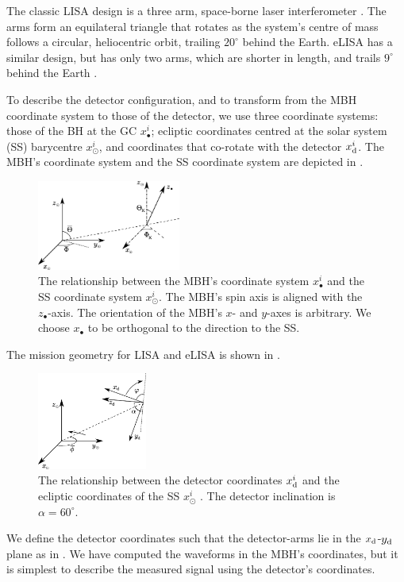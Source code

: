 The classic LISA design is a three arm, space-borne laser interferometer \citep{Bender1998, Danzmann2003}. The arms form an equilateral triangle that rotates as the system's centre of mass follows a circular, heliocentric orbit, trailing $20^{\circ}$ behind the Earth. eLISA has a similar design, but  has only two arms, which are shorter in length, and trails $9^{\circ}$ behind the Earth \citep{Jennrich2011}.

To describe the detector configuration, and to transform from the MBH coordinate system to those of the detector, we use three coordinate systems: those of the BH at the GC $x_\bullet^i$; ecliptic coordinates centred at the solar system (SS) barycentre $x_\odot^i$, and coordinates that co-rotate with the detector $x_\mathrm{d}^i$. The MBH's coordinate system and the SS coordinate system are depicted in .
\begin{figure}
\begin{center}
 \includegraphics[width=0.42\textwidth]{./images/BH_SS_angles}
    \caption{The relationship between the MBH's coordinate system $x_\bullet^i$ and the SS coordinate system $x_\odot^i$. The MBH's spin axis is aligned with the $z_\bullet$-axis. The orientation of the MBH's $x$- and $y$-axes is arbitrary. We choose $x_\bullet$ to be orthogonal to the direction to the SS.}
   \label{fig:BH_SS}
\end{center}
\end{figure}
The mission geometry for LISA and eLISA is shown in .
\begin{figure}
\begin{center}
 \includegraphics[width=0.32\textwidth]{./images/SS_LISA}
    \caption{The relationship between the detector coordinates $x_\mathrm{d}^i$ and the ecliptic coordinates of the SS $x_\odot^i$ \citep{Bender1998, Jennrich2011}. The detector inclination is $\alpha = 60^{\circ}$.}
   \label{fig:SS_LISA}
\end{center}
\end{figure}
We define the detector coordinates such that the detector-arms lie in the $x_\mathrm{d}$-$y_\mathrm{d}$ plane as in \citet{Cutler1998}. We have computed the waveforms in the MBH's coordinates, but it is simplest to describe the measured signal using the detector's coordinates.

